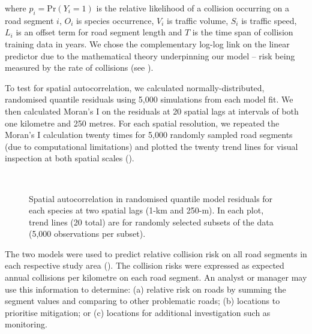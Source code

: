 \noindent where $p_i=\text{Pr}(Y_i=1)$ is the relative likelihood of a collision occurring on a road segment $i$, $O_i$ is species occurrence, $V_i$ is traffic volume, $S_i$ is traffic speed, $L_i$ is an offset term for road segment length and $T$ is the time span of collision training data in years. We chose the complementary log-log link on the linear predictor due to the mathematical theory underpinning our model -- risk being measured by the rate of collisions (see ).

To test for spatial autocorrelation, we calculated normally-distributed, randomised quantile residuals \citep[see][]{dunn96} using 5,000 simulations from each model fit. We then calculated Moran's I on the residuals at 20 spatial lags at intervals of both one kilometre and 250 metres.  For each spatial resolution, we repeated the Moran's I calculation twenty times for 5,000 randomly sampled road segments (due to computational limitations) and plotted the twenty trend lines for visual inspection at both spatial scales ().

\begin{figure*}[!h]
  \captionsetup[subfloat]{farskip=-2pt,nearskip=-2pt}
  \centering
  \\[1cm]
  \caption[Spatial autocorrelation in randomised quantile model residuals for kangaroos and deer]{Spatial autocorrelation in randomised quantile model residuals for each species at two spatial lags (1-km and 250-m).  In each plot, trend lines (20 total) are for randomly selected subsets of the data (5,000 observations per subset).}
  \label{cal_sac}
\end{figure*}

The two models were used to predict relative collision risk on all road segments in each respective study area (). The collision risks were expressed as expected annual collisions per kilometre on each road segment. An analyst or manager may use this information to determine: (a) relative risk on roads by summing the segment values and comparing to other problematic roads; (b) locations to prioritise mitigation; or (c) locations for additional investigation such as monitoring.

